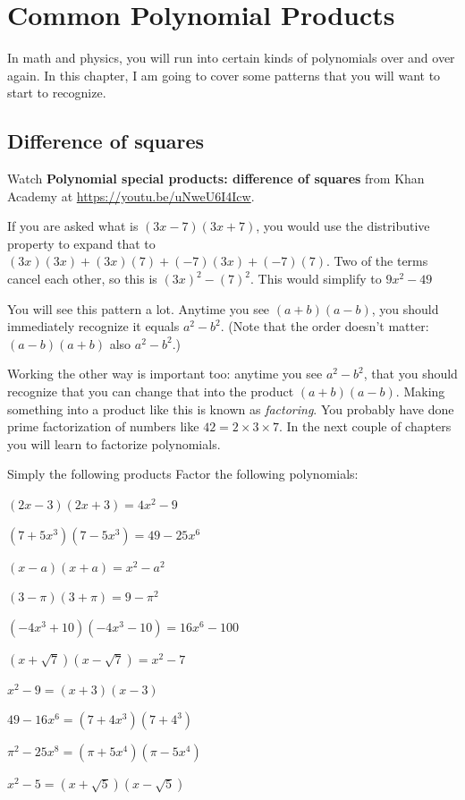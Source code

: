 \chapter{Common Polynomial Products}

In math and physics, you will run into certain kinds of polynomials
over and over again. In this chapter, I am going to cover some
patterns that you will want to start to recognize.

\section{Difference of squares}

Watch \textbf{Polynomial special products: difference of squares} from Khan Academy at \url{https://youtu.be/uNweU6I4Icw}.

If you are asked what is $(3x - 7)(3x + 7)$, you would use the
distributive property to expand that to $(3x)(3x) + (3x)(7) + (-7)(3x) + (-7)(7)$.
Two of the terms cancel each other, so this is $(3x)^2 - (7)^2$. This would simplify to $9x^2 - 49$

You will see this pattern a lot. Anytime you see $(a + b)(a - b)$, you should immediately
recognize it equals $a^2 - b^2$. (Note that the order doesn't matter: $(a - b)(a + b)$ also $a^2 - b^2$.)

Working the other way is important too: anytime you see $a^2 - b^2$,
that you should recognize that you can change that into the product
$(a + b)(a - b)$. Making something into a product like this is known as
\emph{factoring}. You probably have done prime factorization of
numbers like $42 = 2 \times 3 \times 7$. In the next couple of
chapters you will learn to factorize polynomials.

\begin{Exercise}[title={Difference of Squares}, label=diffsquares]
  Simply the following products
  Factor the following polynomials:
\end{Exercise}
\begin{Answer}[ref=diffsquares]
  $(2x - 3)(2x + 3) = 4x^2 - 9$
  
  $(7 + 5x^3)(7 - 5x^3) = 49 - 25x^6$
  
  $(x - a)(x + a) = x^2 - a^2$
  
  $(3 - \pi)(3 + \pi) = 9 - \pi^2$
  
  $(-4x^3 + 10)(-4x^3 - 10) = 16x^6 - 100$
  
  $(x + \sqrt{7})(x - \sqrt{7}) = x^2 - 7$

  $x^2 - 9 = (x + 3)(x - 3)$

  $49 - 16x^6 = (7 + 4x^3)(7 + 4^3)$
  
  $\pi^2 - 25x^8 = (\pi + 5x^4)(\pi - 5x^4)$
  
  $x^2 - 5 = (x + \sqrt{5})(x - \sqrt{5})$

\end{Answer}

